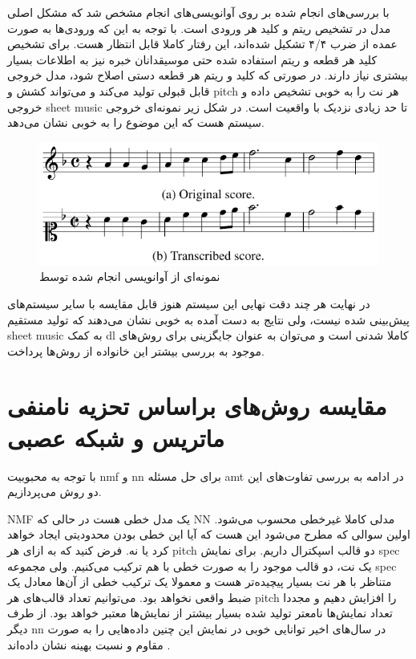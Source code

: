 با بررسی‌های انجام شده بر روی آوانویسی‌های انجام مشخص شد که مشکل اصلی مدل در
تشخیص ریتم و کلید هر ورودی است. با توجه به این که ورودی‌ها به صورت عمده از ضرب
۴/۴ تشکیل شده‌اند، این رفتار کاملا قابل انتظار هست. برای تشخیص کلید هر قطعه و
ریتم استفاده شده حتی موسیقدانان خبره نیز به اطلاعات بسیار بیشتری نیاز دارند. در
صورتی که کلید و ریتم هر قطعه دستی اصلاح شود، مدل خروجی قابل قبولی تولید می‌کند و
می‌تواند کشش و \gls{pitch} هر نت را به خوبی تشخیص داده و خروجی \gls{sheet music}
تا حد زیادی نزدیک با واقعیت است. در شکل زیر نمونه‌ای خروجی سیستم هست که این
موضوع را به خوبی نشان می‌دهد.
\begin{figure}[ht]
    \centering
    \includegraphics[width=12cm]{./statics/roman2018end_output.png}
    \caption{نمونه‌ای از آوانویسی انجام شده توسط \cite{roman2018end}}
\end{figure}

در نهایت هر چند دقت نهایی این سیستم هنوز قابل مقایسه با سایر سیستم‌های پیش‌بینی
شده نیست، ولی نتایج به دست آمده به خوبی نشان می‌دهند که تولید مستقیم \gls{sheet
music} به کمک \gls{dl} کاملا شدنی است و می‌توان به عنوان جایگزینی برای روش‌های
موجود به بررسی بیشتر این خانواده از روش‌ها پرداخت.

\section{مقایسه روش‌های براساس تحزیه نامنفی ماتریس و شبکه عصبی}
با توجه به محبوبیت \gls{nmf} و \gls{nn} برای حل مسئله \gls{amt} در ادامه به
بررسی تفاوت‌های این دو روش می‌پردازیم.

\gls{NMF} یک مدل خطی هست در حالی که \gls{NN} مدلی کاملا غیرخطی محسوب می‌شود.
اولین سوالی که مطرح می‌شود این هست که آیا این خطی بودن محدودیتی ایجاد خواهد کرد
یا نه. فرض کنید که به ازای هر \gls{pitch} دو قالب اسپکترال داریم. برای نمایش
\gls{spec} یک نت، دو قالب موجود را به صورت خطی با هم ترکیب می‌کنیم. ولی مجموعه
\gls{spec} متناظر با هر نت بسیار پیچیده‌تر هست و معمولا یک ترکیب خطی از آن‌ها
معادل یک ضبط واقعی نخواهد بود. می‌توانیم تعداد قالب‌های هر \gls{pitch} را افزایش
دهیم و مجددا تعداد نمایش‌ها نامعتر تولید شده بسیار بیشتر از نمایش‌ها معتبر خواهد
بود. از طرف دیگر \gls{nn} در سال‌های اخیر توانایی خوبی در نمایش این چنین
داده‌هایی را به صورت مقاوم و نسبت بهینه نشان داده‌اند \cite{goodfellow2016deep}.

